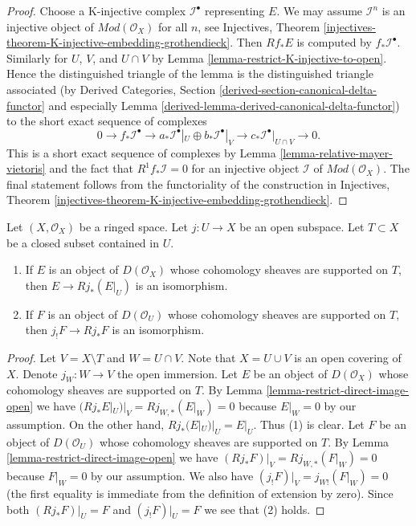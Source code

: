 \begin{proof}
Choose a K-injective complex $\mathcal{I}^\bullet$
representing $E$. We may assume $\mathcal{I}^n$ is an injective
object of $\textit{Mod}(\mathcal{O}_X)$ for all $n$, see
Injectives, Theorem
\ref{injectives-theorem-K-injective-embedding-grothendieck}.
Then $Rf_*E$ is computed by $f_*\mathcal{I}^\bullet$.
Similarly for $U$, $V$, and $U \cap V$ by
Lemma \ref{lemma-restrict-K-injective-to-open}.
Hence the distinguished triangle of the lemma is the distinguished
triangle associated (by
Derived Categories, Section
\ref{derived-section-canonical-delta-functor} and especially
Lemma \ref{derived-lemma-derived-canonical-delta-functor})
to the short exact sequence of complexes
$$
0 \to
f_*\mathcal{I}^\bullet \to
a_*\mathcal{I}^\bullet|_U \oplus b_*\mathcal{I}^\bullet|_V \to
c_*\mathcal{I}^\bullet|_{U \cap V} \to
0.
$$
This is a short exact sequence of complexes by
Lemma \ref{lemma-relative-mayer-vietoris}
and the fact that $R^1f_*\mathcal{I} = 0$
for an injective object $\mathcal{I}$ of $\textit{Mod}(\mathcal{O}_X)$.
The final statement follows from the functoriality of the construction
in Injectives, Theorem
\ref{injectives-theorem-K-injective-embedding-grothendieck}.
\end{proof}

\begin{lemma}
\label{lemma-pushforward-restriction}
Let $(X, \mathcal{O}_X)$ be a ringed space. Let $j : U \to X$ be an
open subspace. Let $T \subset X$ be a closed subset contained in $U$.
\begin{enumerate}
\item If $E$ is an object of $D(\mathcal{O}_X)$ whose cohomology sheaves
are supported on $T$, then $E \to Rj_*(E|_U)$ is an isomorphism.
\item If $F$ is an object of $D(\mathcal{O}_U)$ whose cohomology sheaves
are supported on $T$, then $j_!F \to Rj_*F$ is an isomorphism.
\end{enumerate}
\end{lemma}

\begin{proof}
Let $V = X \setminus T$ and $W = U \cap V$. Note that $X = U \cup V$ is an
open covering of $X$. Denote $j_W : W \to V$ the open immersion.
Let $E$ be an object of $D(\mathcal{O}_X)$ whose cohomology sheaves are
supported on $T$. By
Lemma \ref{lemma-restrict-direct-image-open} we have
$(Rj_*E|_U)|_V = Rj_{W, *}(E|_W) = 0$ because $E|_W = 0$ by our assumption.
On the other hand, $Rj_*(E|_U)|_U = E|_U$. Thus (1) is clear.
Let $F$ be an object of $D(\mathcal{O}_U)$ whose cohomology sheaves
are supported on $T$. By
Lemma \ref{lemma-restrict-direct-image-open} we have
$(Rj_*F)|_V = Rj_{W, *}(F|_W) = 0$ because $F|_W = 0$ by our assumption.
We also have $(j_!F)|_V = j_{W!}(F|_W) = 0$ (the first equality is immediate
from the definition of extension by zero). Since both
$(Rj_*F)|_U = F$ and $(j_!F)|_U = F$ we see that (2) holds.
\end{proof}

